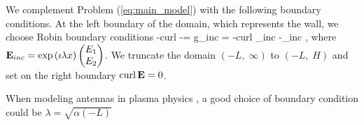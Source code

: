 We complement Problem (\ref{eq:main_model}) with the following boundary conditions.
At the left boundary of the domain, which represents the wall, we choose Robin boundary conditions 
\be
-curl \E -\imath \lambda\E \wedge \n = g_{inc} = -curl \E_{inc} -\imath\lambda\E_{inc} \wedge \n,
\ee
where ${\bf E}_{inc} = \exp \left(\imath \lambda x\right)\begin{pmatrix} E_1\\ E_2 \end{pmatrix}$. We truncate the domain 
$(-L,\; \infty)$ to $(-L,\; H)$ and set on the right boundary $\operatorname{curl} {\bf E} = 0$. 
\begin{remark}
	When modeling antennas in plasma physics , 
	a good choice of boundary condition could be $\lambda = \sqrt{\alpha(-L)}$
\end{remark}

